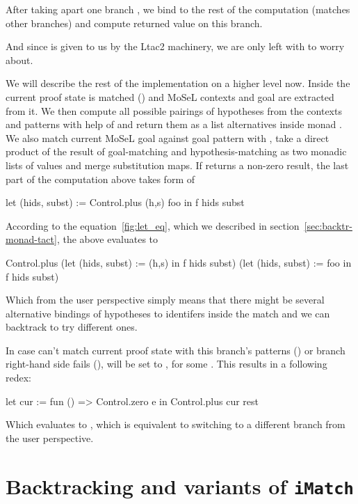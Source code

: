 After taking apart one branch , we bind  to the rest of the computation (matches other branches) and compute returned value on this branch.

And since  is given to us by the Ltac2 machinery, we are only left with  to worry about.

We will describe the rest of the implementation on a higher level now.
Inside  the current proof state is matched () and MoSeL contexts and goal are extracted from it.
We then compute all possible pairings of hypotheses from the contexts and patterns with help of  and return them as a list alternatives inside monad .
We also match current MoSeL goal against goal pattern  with , take a direct product of the result of goal-matching and hypothesis-matching as two monadic lists of values and merge substitution maps.
If  returns a non-zero result, the last part of the computation above takes form of
\begin{coq}
let (hids, subst) := Control.plus (h,s) foo in
f hids subst
\end{coq}

According to the equation~\ref{fig:let_eq}, which we described in section~\ref{sec:backtr-monad-tact}, the above evaluates to
\begin{coq}
Control.plus
  (let (hids, subst) := (h,s) in
    f hids subst)
  (let (hids, subst) := foo in
   f hids subst)
\end{coq}

Which from the user perspective simply means that there might be several alternative bindings of hypotheses to identifers inside the match and we can backtrack to try different ones.

In case  can't match current proof state with this branch's patterns () or branch right-hand side fails (),  will be set to , for some .
This results in a following redex:
\begin{coq}
let cur := fun () => Control.zero e
in Control.plus cur rest
\end{coq}
Which evaluates to , which is equivalent to switching to a different branch from the user perspective.

\section{Backtracking and variants of \texttt{iMatch}}

